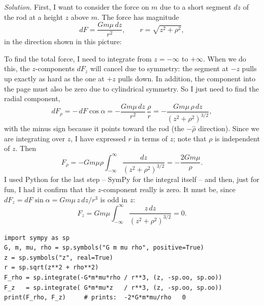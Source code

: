 \medskip
\emph{Solution.} First, I want to consider the force on $m$ due to a
short segment $dz$ of the rod at a height $z$ above $m$. The force has
magnitude
\[
  dF = \frac{G m \mu\, dz}{r^2}, \qquad r = \sqrt{z^2 + \rho^2},
\]
in the direction shown in this picture:
\begin{center}
\end{center}
To find the total force, I need to integrate from $z = -\infty$ to
$+\infty$. When we do this, the $z$-components $dF_z$ will cancel due to
symmetry: the segment at $-z$ pulls up exactly as hard as the one at
$+z$ pulls down. In addition, the component into the page must also be
zero due to cylindrical symmetry. So I just need to find the radial
component,
\[
  dF_\rho = -\,dF \cos\alpha = -\frac{G m \mu\, dz}{r^2}\,\frac{\rho}{r}
          = -\frac{G m \mu\, \rho\, dz}{(z^2+\rho^2)^{3/2}},
\]
with the minus sign because it points toward the rod (the $-\hat\rho$
direction). Since we are integrating over $z$, I have expressed $r$ in
terms of $z$; note that $\rho$ is independent of $z$. Then
\[
  F_\rho = -G m \mu \rho \int_{-\infty}^{\infty} \frac{dz}{(z^2+\rho^2)^{3/2}}
         = -\frac{2 G m \mu}{\rho}.
\]
I used Python for the last step -- SymPy for the integral itself -- and
then, just for fun, I had it confirm that the $z$-component really is
zero. It must be, since $dF_z = dF \sin\alpha = G m \mu\, z\, dz / r^3$
is odd in $z$:
\[
  F_z = G m \mu \int_{-\infty}^{\infty} \frac{z\, dz}{(z^2+\rho^2)^{3/2}} = 0 .
\]
\begin{lstlisting}
import sympy as sp
G, m, mu, rho = sp.symbols("G m mu rho", positive=True)
z = sp.symbols("z", real=True)
r = sp.sqrt(z**2 + rho**2)
F_rho = sp.integrate(-G*m*mu*rho / r**3, (z, -sp.oo, sp.oo))
F_z   = sp.integrate( G*m*mu*z   / r**3, (z, -sp.oo, sp.oo))
print(F_rho, F_z)     # prints:  -2*G*m*mu/rho   0
\end{lstlisting}
